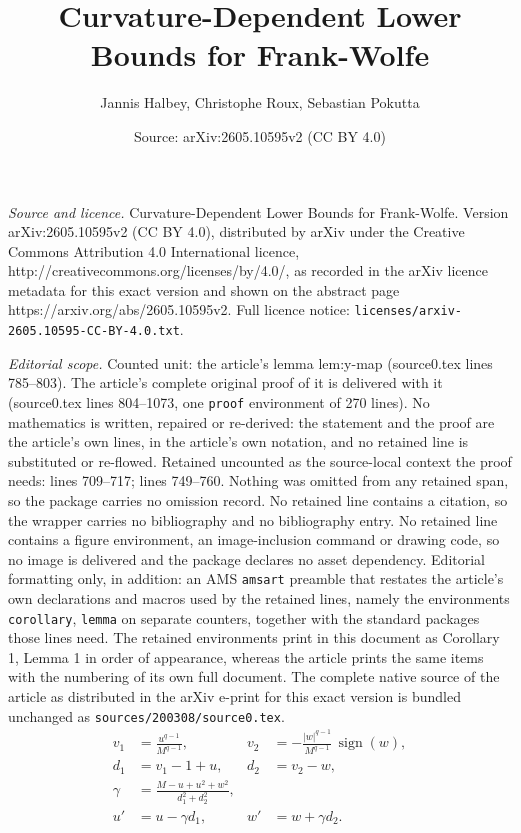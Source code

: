 \documentclass[10pt,a4paper]{amsart}
\title{Curvature-Dependent Lower Bounds for Frank-Wolfe}
\author{Jannis Halbey, Christophe Roux, Sebastian Pokutta}
\date{Source: arXiv:2605.10595v2 (CC BY 4.0)}
\DeclareMathOperator{\sign}{sign}
\begin{document}
\maketitle

\noindent\emph{Source and licence.} Curvature-Dependent Lower Bounds for Frank-Wolfe. Version arXiv:2605.10595v2 (CC BY 4.0), distributed by arXiv under the Creative Commons Attribution 4.0 International licence, http://creativecommons.org/licenses/by/4.0/, as recorded in the arXiv licence metadata for this exact version and shown on the abstract page https://arxiv.org/abs/2605.10595v2. Full licence notice: \texttt{licenses/arxiv-2605.10595-CC-BY-4.0.txt}.\par\smallskip

\noindent\textit{Editorial scope.} Counted unit: the article's lemma lem:y-map (source0.tex lines 785--803). The article's complete original proof of it is delivered with it (source0.tex lines 804--1073, one \texttt{proof} environment of 270 lines). No mathematics is written, repaired or re-derived: the statement and the proof are the article's own lines, in the article's own notation, and no retained line is substituted or re-flowed.  Retained uncounted as the source-local context the proof needs: lines 709--717; lines 749--760.  Nothing was omitted from any retained span, so the package carries no omission record.  No retained line contains a citation, so the wrapper carries no bibliography and no bibliography entry.  No retained line contains a figure environment, an image-inclusion command or drawing code, so no image is delivered and the package declares no asset dependency.  Editorial formatting only, in addition: an AMS \texttt{amsart} preamble that restates the article's own declarations and macros used by the retained lines, namely the environments \texttt{corollary}, \texttt{lemma} on separate counters, together with the standard packages those lines need.  The retained environments print in this document as Corollary 1, Lemma 1 in order of appearance, whereas the article prints the same items with the numbering of its own full document.  The complete native source of the article as distributed in the arXiv e-print for this exact version is bundled unchanged as \texttt{sources/200308/source0.tex}.
    \begin{align}
        v_1 &= \frac{u^{q-1}}{M^{q-1}}, &
        v_2 &= -\frac{|w|^{q-1}}{M^{q-1}}\,\sign(w), \label{eq:lmo-uw} \\
        d_1 &= v_1-1+u, &
        d_2 &= v_2-w, \label{eq:dir-uw} \\
        \gamma &= \frac{M-u+u^2+w^2}{d_1^2+d_2^2}, \label{eq:gamma-uw} \\
        u' &= u-\gamma d_1, &
        w' &= w+\gamma d_2. \label{eq:update-uw}
    \end{align}
\end{document}
